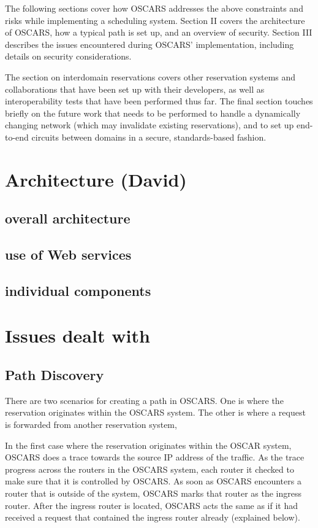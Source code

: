 \documentclass[conference]{IEEEtran}
\begin{document}
The following sections cover how OSCARS addresses the above constraints and
risks while implementing a scheduling system.
Section II covers the architecture of OSCARS, how a typical path is set
up, and an overview of security.  Section III describes the issues encountered 
during OSCARS' implementation, including details on security considerations.  

The section on interdomain reservations covers other reservation systems and 
collaborations that have been set up with their developers, as well as 
interoperability tests that have been performed thus far.  The final section 
touches briefly on the future work that needs to be performed
to handle a dynamically changing network (which may invalidate existing
reservations), and to set up end-to-end circuits between domains
in a secure, standards-based fashion.


\section{Architecture (David)}

\subsection{overall architecture}
\subsection{use of Web services}
\subsection{individual components}

\section{Issues dealt with}
\subsection{Path Discovery}
There are two scenarios for creating a path in OSCARS.  One is where the
reservation originates within the OSCARS system.  The other is where a request
is forwarded from another reservation system, 

In the first case where the reservation originates within the OSCAR system,
OSCARS does a trace towards the source IP address of the traffic. As the trace
progress across the routers in the OSCARS system, each router it checked to make
sure that it is controlled by OSCARS. As soon as OSCARS encounters a router that
is outside of the system, OSCARS marks that router as the ingress router. After
the ingress router is located, OSCARS acts the same as if it had received a
request that contained the ingress router already (explained below).
\end{document}
